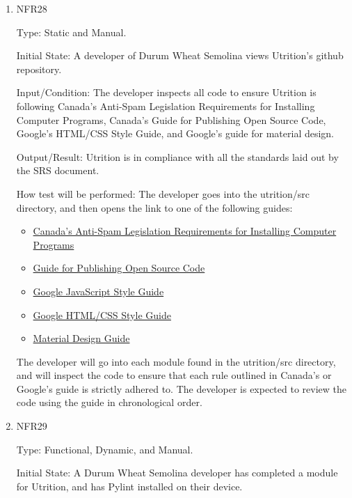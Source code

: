 \documentclass[12pt, titlepage]{article}
\begin{document}
	\begin{enumerate}
		\item{NFR28\\}
		
		Type: Static and Manual.
		
		Initial State: A developer of Durum Wheat Semolina views Utrition’s github repository.
		
		Input/Condition: The developer inspects all code to ensure Utrition is following Canada’s Anti-Spam Legislation Requirements for Installing Computer Programs, Canada’s Guide for Publishing Open Source Code, Google’s HTML/CSS Style Guide, and Google’s guide for material design.
		
		Output/Result: Utrition is in compliance with all the standards laid out by the SRS document.
		
		How test will be performed: The developer goes into the utrition/src directory, and then opens the link to one of the following guides:
		\begin{itemize}
			\item \href{https://crtc.gc.ca/eng/internet/install.htm}{Canada’s Anti-Spam Legislation Requirements for Installing Computer Programs}
			\item \href{https://www.canada.ca/en/government/system/digital-government/digital-government-innovations/open-source-software/guide-for-publishing-open-source-code.html}{Guide for Publishing Open Source Code}
			\item \href{https://google.github.io/styleguide/jsguide.html}{Google JavaScript Style Guide}
			\item \href{https://google.github.io/styleguide/htmlcssguide.html}{Google HTML/CSS Style Guide}
			\item \href{https://material.io/design}{Material Design Guide}
		\end{itemize}
		The developer will go into each module found in the utrition/src directory, and will inspect the code to ensure that each rule outlined in Canada’s or Google’s guide is strictly adhered to. The developer is expected to review the code using the guide in chronological order.
		
		\item{NFR29\\}
		
		Type: Functional, Dynamic, and Manual.
		
		Initial State: A Durum Wheat Semolina developer has completed a module for Utrition, and has Pylint installed on their device.
		

\end{enumerate}
\end{document}
